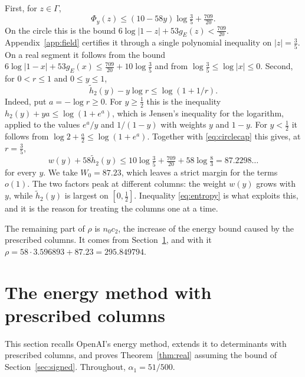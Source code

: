 \documentclass[11pt]{amsart}
\newcommand{\Rho}{295.849794}
\newcommand{\Ctwo}{3.596893}
\newcommand{\WZero}{87.23}
\newcommand{\AlphaOne}{51/500}
\theoremstyle{definition}
\theoremstyle{remark}
\numberwithin{equation}{section}
\begin{document}
First, for $z\in\Gamma$,
\begin{equation}\label{eq:circlecap}
 \Phi_y(z)\le(10-58y)\log\tfrac35+\tfrac{709}{20} .
\end{equation}
On the circle this is the bound $6\log|1-z|+53g_E(z)<\frac{709}{20}$. Appendix~\ref{app:field} certifies it through
a single polynomial inequality on $|z|=\frac35$. On a real segment it follows from the bound
$6\log|1-x|+53g_E(x)\le\frac{709}{20}+10\log\frac35$ and from $\log\frac35\le\log|x|\le0$. Second, for $0<r\le1$ and $0\le y\le1$,
\begin{equation}\label{eq:entropy}
 \tilde h_2(y)-y\log r\le\log(1+1/r) .
\end{equation}
Indeed, put $a=-\log r\ge0$. For $y\ge\frac12$ this is the inequality $h_2(y)+ya\le\log(1+e^a)$, which is
Jensen's inequality for the logarithm, applied to the values $e^a/y$ and $1/(1-y)$ with weights $y$ and $1-y$.
For $y<\frac12$ it follows from $\log2+\frac a2\le\log(1+e^a)$. Together with \eqref{eq:circlecap} this gives, at
$r=\frac35$,
\[
 w(y)+58\tilde h_2(y)\le10\log\tfrac35+\tfrac{709}{20}+58\log\tfrac83=87.2298\ldots
\]
for every $y$. We take $W_0=\WZero$, which leaves a strict margin for the terms $o(1)$. The two factors peak at
different columns: the weight $w(y)$ grows with $y$, while $\tilde h_2(y)$ is largest on $[0,\frac12]$.
Inequality \eqref{eq:entropy} is what exploits this, and it is the reason for treating the columns one at a time.

The remaining part of $\rho$ is $n_0c_2$, the increase of the energy bound caused by the prescribed
columns. It comes from Section~\ref{sec:energy}, and with it $\rho=58\cdot\Ctwo+\WZero=\Rho$.
\section{The energy method with prescribed columns}\label{sec:energy}

This section recalls OpenAI's energy method, extends it to determinants with prescribed columns, and
proves Theorem~\ref{thm:real} assuming the bound of Section~\ref{sec:signed}. Throughout, $\alpha_1=\AlphaOne$.
\end{document}
